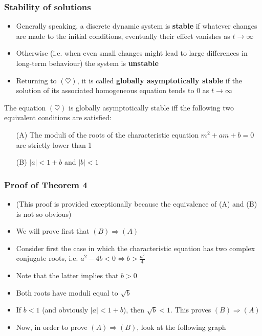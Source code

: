 \documentclass[10pt,usenames,dvipsnames]{beamer}
\theoremstyle{definition}
\begin{document}
\begin{frame}[fragile]
\frametitle{Stability of solutions}
\begin{itemize}
	\item Generally speaking, a discrete dynamic system is \textbf{stable} if whatever changes are made to the initial conditions, eventually their effect vanishes as $t \to \infty$
	\item Otherwise (i.e. when even small changes might lead to large differences in long-term behaviour) the system is \textbf{unstable}
	\item Returning to $(\heartsuit)$, it is called \textbf{globally asymptotically stable} if the solution of its associated homogeneous equation tends to 0 as $t \to \infty$
\end{itemize}

\begin{theorem}
	The equation $(\heartsuit)$ is globally asymptotically stable iff the following two equivalent conditions are satisfied:
	\begin{itemize}
		\item[(A)] The moduli of the roots of the characteristic equation $m^{2} + am + b = 0$ are strictly lower than 1
		\item[(B)] $|a| < 1 + b$ and $|b| < 1$
	\end{itemize}
\end{theorem}
\end{frame}

\begin{frame}[fragile]
\frametitle{Proof of Theorem 4}
\begin{itemize}
	\item (This proof is provided exceptionally because the equivalence of (A) and (B) is not so obvious)
	\item We will prove first that $(B) \Rightarrow (A)$
	\item Consider first the case in which the characteristic equation has two complex conjugate roots, i.e. $\displaystyle a^2 - 4b < 0 \Leftrightarrow b > \frac{a^{2}}{4}$
	\item Note that the latter implies that $b > 0$
	\item Both roots have moduli equal to $\sqrt{b}$
	\item If $b < 1$ (and obviously $|a| < 1 + b$), then $\sqrt{b} < 1$. This proves $(B) \Rightarrow (A)$
	\item Now, in order to prove $(A) \Rightarrow (B)$, look at the following graph
\end{itemize}
\end{frame}
\end{document}
